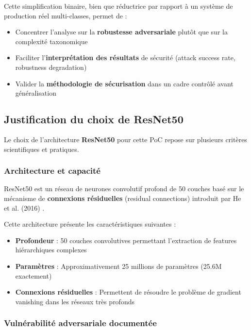 Cette simplification binaire, bien que réductrice par rapport à un système de production réel multi-classes, permet de :
\begin{itemize}
    \item Concentrer l'analyse sur la \textbf{robustesse adversariale} plutôt que sur la complexité taxonomique
    \item Faciliter l'\textbf{interprétation des résultats} de sécurité (attack success rate, robustness degradation)
    \item Valider la \textbf{méthodologie de sécurisation} dans un cadre contrôlé avant généralisation
\end{itemize}


\subsection{Justification du choix de ResNet50}

Le choix de l'architecture \textbf{ResNet50} \cite{he2016deep} pour cette PoC repose sur plusieurs critères scientifiques et pratiques.

\subsubsection{Architecture et capacité}

ResNet50 est un réseau de neurones convolutif profond de 50 couches basé sur le mécanisme de \textbf{connexions résiduelles} (residual connections) introduit par He et al. (2016) \cite{he2016deep}.



Cette architecture présente les caractéristiques suivantes :
\begin{itemize}
    \item \textbf{Profondeur} : 50 couches convolutives permettant l'extraction de features hiérarchiques complexes
    \item \textbf{Paramètres} : Approximativement 25 millions de paramètres (25.6M exactement)
    \item \textbf{Connexions résiduelles} : Permettent de résoudre le problème de gradient vanishing dans les réseaux très profonds

\end{itemize}



\subsubsection{Vulnérabilité adversariale documentée}

